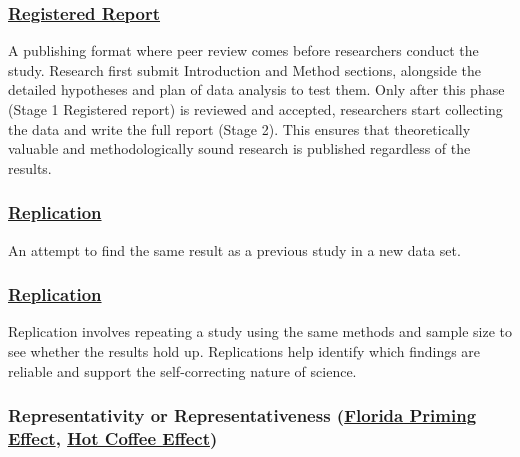 \documentclass[
  letterpaper,
]{book}
\begin{document}
\subsubsection*{\texorpdfstring{\hyperref[def-registeredreport]{Registered
Report}}{Registered Report}}\label{registered-report}

A publishing format where peer review comes before researchers conduct
the study. Research first submit Introduction and Method sections,
alongside the detailed hypotheses and plan of data analysis to test
them. Only after this phase (Stage 1 Registered report) is reviewed and
accepted, researchers start collecting the data and write the full
report (Stage 2). This ensures that theoretically valuable and
methodologically sound research is published regardless of the results.

\subsubsection*{\texorpdfstring{\hyperref[def-replication]{Replication}}{Replication}}\label{replication}

An attempt to find the same result as a previous study in a new data
set.

\subsubsection*{\texorpdfstring{\hyperref[def-replication]{Replication}}{Replication}}\label{replication-1}

Replication involves repeating a study using the same methods and sample
size to see whether the results hold up. Replications help identify
which findings are reliable and support the self-correcting nature of
science.

\subsubsection*{\texorpdfstring{Representativity or Representativeness
(\hyperref[def-representativity]{Florida Priming Effect},
\hyperref[def-representativity]{Hot Coffee
Effect})}{Representativity or Representativeness (Florida Priming Effect, Hot Coffee Effect)}}\label{representativity-or-representativeness-florida-priming-effect-hot-coffee-effect}
\end{document}
